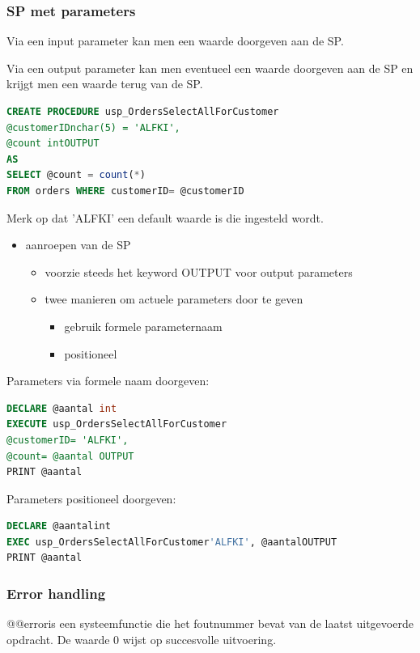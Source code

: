 \documentclass[a4paper,12pt]{article}
\begin{document}
\subsubsection{SP met parameters}
Via een input parameter kan men een waarde doorgeven aan de SP.

Via een output parameter kan men eventueel een waarde doorgeven aan de SP en krijgt men een waarde terug van de SP.

\begin{lstlisting}[language=sql, breaklines=true]
CREATE PROCEDURE usp_OrdersSelectAllForCustomer
@customerIDnchar(5) = 'ALFKI',
@count intOUTPUT
AS
SELECT @count = count(*)
FROM orders WHERE customerID= @customerID
\end{lstlisting}
Merk op dat 'ALFKI' een default waarde is die ingesteld wordt.

\begin{itemize}
\item aanroepen van de SP
	\begin{itemize}
	\item voorzie steeds het keyword OUTPUT voor output parameters
	\item twee manieren om actuele parameters door te geven
		\begin{itemize}
		\item gebruik formele parameternaam
		\item positioneel
		\end{itemize}
	\end{itemize}
\end{itemize}

Parameters via formele naam doorgeven:
\begin{lstlisting}[language=sql, breaklines=true]
DECLARE @aantal int
EXECUTE usp_OrdersSelectAllForCustomer
@customerID= 'ALFKI',
@count= @aantal OUTPUT
PRINT @aantal
\end{lstlisting}

Parameters positioneel doorgeven:
\begin{lstlisting}[language=sql, breaklines=true]
DECLARE @aantalint
EXEC usp_OrdersSelectAllForCustomer'ALFKI', @aantalOUTPUT
PRINT @aantal
\end{lstlisting}

\subsubsection{Error handling}
@@erroris een systeemfunctie die het foutnummer bevat van de laatst uitgevoerde opdracht. De waarde 0 wijst op succesvolle uitvoering.
\end{document}
